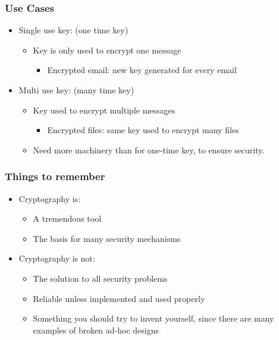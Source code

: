 \documentclass[12pt]{book}
\begin{document}
\subsubsection{Use Cases}
\begin{itemize}
	\item Single use key: (one time key)
	\begin{itemize}
		\item Key is only used to encrypt one message
		\begin{itemize}
			\item Encrypted email: new key generated for every email
		\end{itemize}
	\end{itemize}
	\item Multi use key: (many time key)
	\begin{itemize}
		\item Key used to encrypt multiple messages
		\begin{itemize}
			\item Encrypted files: same key used to encrypt many files
		\end{itemize}
		\item Need more machinery than for one-time key, to ensure security.
	\end{itemize}
\end{itemize}

\subsubsection{Things to remember}
\begin{itemize}
	\item Cryptography is:
	\begin{itemize}
		\item A tremendous tool
		\item The basis for many security mechanisms
	\end{itemize}
	\item Cryptography is not:
	\begin{itemize}
		\item The solution to all security problems
		\item Reliable unless implemented and used properly
		\item Something you should try to invent yourself, since there are many examples of broken ad-hoc designs
	\end{itemize}
\end{itemize}
\end{document}
